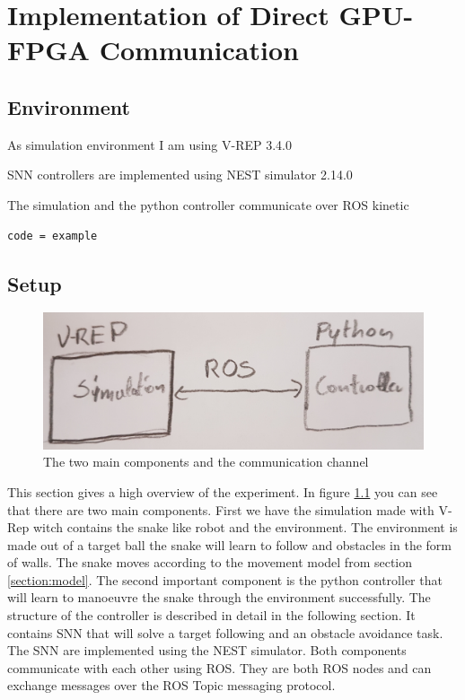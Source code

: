 \chapter{Implementation of Direct GPU-FPGA Communication}
\label{section:implementation}

\section{Environment}

As simulation environment I am using V-REP 3.4.0\cite{Rohmer2013}

SNN controllers are implemented using NEST simulator 2.14.0\cite{Peyser2017}

The simulation and the python controller communicate over ROS kinetic\cite{}



\begin{lstlisting}[label=listing:example_code, caption=example]
code = example
\end{lstlisting}

\section{Setup}

\begin{figure}
	\includegraphics[width=\linewidth]{images/setup.jpg}
	\caption{The two main components and the communication channel}
	\label{fig:setup}
\end{figure}


This section gives a high overview of the experiment. In figure \ref{fig:setup} you can see that there are two main components. First we have the simulation made with V-Rep witch contains the snake like robot and the environment. The environment is made out of a target ball the snake will learn to follow and obstacles in the form of walls. The snake moves according to the movement model from section \ref{section:model}. The second important component is the python controller that will learn to manoeuvre the snake through the environment successfully. The structure of the controller is described in detail in the following section. It contains SNN that will solve a target following and an obstacle avoidance task. The SNN are implemented using the NEST simulator. Both components communicate with each other using ROS. They are both ROS nodes and can exchange messages over the ROS Topic messaging protocol.


